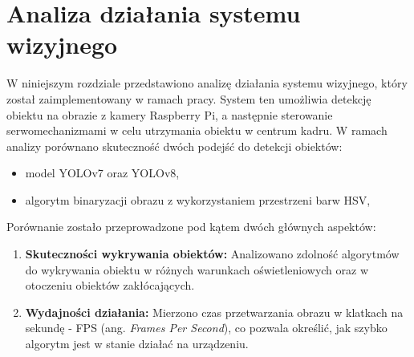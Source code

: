 \documentclass[a4paper,twoside,12pt]{book}
\begin{document}







%      


\chapter{Analiza działania systemu wizyjnego}
\label{ch:05}
W niniejszym rozdziale przedstawiono analizę działania systemu wizyjnego, który został zaimplementowany w ramach pracy. System ten umożliwia detekcję obiektu na obrazie z kamery Raspberry Pi, a następnie sterowanie serwomechanizmami w celu utrzymania obiektu w centrum kadru. W ramach analizy porównano skuteczność dwóch podejść do detekcji obiektów: 
\begin{itemize}
    \item model YOLOv7 oraz YOLOv8,
    \item algorytm binaryzacji obrazu z wykorzystaniem przestrzeni barw HSV,
\end{itemize}

Porównanie zostało przeprowadzone pod kątem dwóch głównych aspektów:
\begin{enumerate}
    \item \textbf{Skuteczności wykrywania obiektów:} Analizowano zdolność algorytmów do wykrywania obiektu w różnych warunkach oświetleniowych oraz w otoczeniu obiektów zakłócających.
    \item \textbf{Wydajności działania:} Mierzono czas przetwarzania obrazu w klatkach na sekundę - FPS (ang. \textit{Frames Per Second}), co pozwala określić, jak szybko algorytm jest w stanie działać na urządzeniu.
\end{enumerate}
\end{document}
